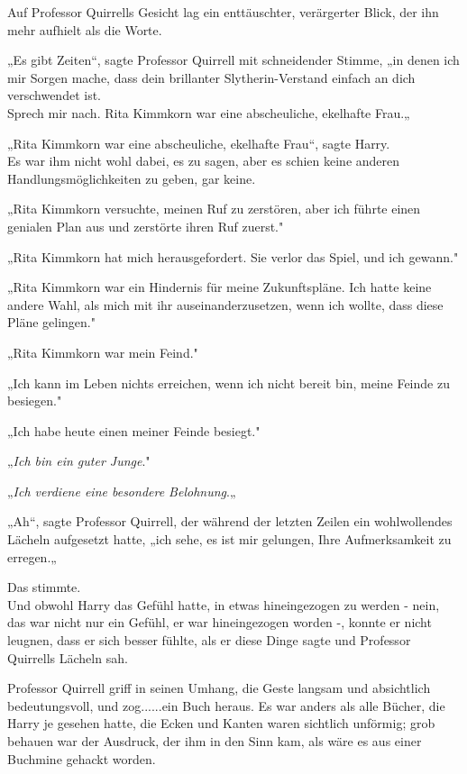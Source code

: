 {Auf Professor Quirrells Gesicht lag ein enttäuschter, verärgerter Blick, der ihn mehr aufhielt als die Worte.

„Es gibt Zeiten“, sagte Professor Quirrell mit schneidender Stimme, „in denen ich mir Sorgen mache, dass dein brillanter Slytherin-Verstand einfach an dich verschwendet ist.\\ Sprech mir nach. Rita Kimmkorn war eine abscheuliche, ekelhafte Frau.„

„Rita Kimmkorn war eine abscheuliche, ekelhafte Frau“, sagte Harry.\\ Es war ihm nicht wohl dabei, es zu sagen, aber es schien keine anderen Handlungsmöglichkeiten zu geben, gar keine.

„Rita Kimmkorn versuchte, meinen Ruf zu zerstören, aber ich führte einen genialen Plan aus und zerstörte ihren Ruf zuerst."

„Rita Kimmkorn hat mich herausgefordert. Sie verlor das Spiel, und ich gewann."

„Rita Kimmkorn war ein Hindernis für meine Zukunftspläne. Ich hatte keine andere Wahl, als mich mit ihr auseinanderzusetzen, wenn ich wollte, dass diese Pläne gelingen."

„Rita Kimmkorn war mein Feind."

„Ich kann im Leben nichts erreichen, wenn ich nicht bereit bin, meine Feinde zu besiegen."

„Ich habe heute einen meiner Feinde besiegt."

„\emph{Ich bin ein guter Junge}."

„\emph{Ich verdiene eine besondere Belohnung}.„

„Ah“, sagte Professor Quirrell, der während der letzten Zeilen ein wohlwollendes Lächeln aufgesetzt hatte, „ich sehe, es ist mir gelungen, Ihre Aufmerksamkeit zu erregen.„

Das stimmte.\\ Und obwohl Harry das Gefühl hatte, in etwas hineingezogen zu werden - nein, das war nicht nur ein Gefühl, er war hineingezogen worden -, konnte er nicht leugnen, dass er sich besser fühlte, als er diese Dinge sagte und Professor Quirrells Lächeln sah.

Professor Quirrell griff in seinen Umhang, die Geste langsam und absichtlich bedeutungsvoll, und zog......ein Buch heraus. Es war anders als alle Bücher, die Harry je gesehen hatte, die Ecken und Kanten waren sichtlich unförmig; grob behauen war der Ausdruck, der ihm in den Sinn kam, als wäre es aus einer Buchmine gehackt worden.

}
